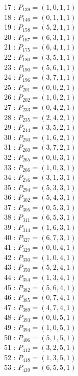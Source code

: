 \documentclass{article}
\begin{document}
{\begin{multicols}{3}
17 : $P_{139}=( 1, 0, 1, 1 )$\\
18 : $P_{146}=( 0, 1, 1, 1 )$\\
19 : $P_{158}=( 5, 2, 1, 1 )$\\
20 : $P_{167}=( 6, 3, 1, 1 )$\\
21 : $P_{175}=( 6, 4, 1, 1 )$\\
22 : $P_{180}=( 3, 5, 1, 1 )$\\
23 : $P_{190}=( 5, 6, 1, 1 )$\\
24 : $P_{196}=( 3, 7, 1, 1 )$\\
25 : $P_{201}=( 0, 0, 2, 1 )$\\
26 : $P_{202}=( 1, 0, 2, 1 )$\\
27 : $P_{233}=( 0, 4, 2, 1 )$\\
28 : $P_{235}=( 2, 4, 2, 1 )$\\
29 : $P_{244}=( 3, 5, 2, 1 )$\\
30 : $P_{250}=( 1, 6, 2, 1 )$\\
31 : $P_{260}=( 3, 7, 2, 1 )$\\
32 : $P_{265}=( 0, 0, 3, 1 )$\\
33 : $P_{266}=( 1, 0, 3, 1 )$\\
34 : $P_{276}=( 3, 1, 3, 1 )$\\
35 : $P_{294}=( 5, 3, 3, 1 )$\\
36 : $P_{302}=( 5, 4, 3, 1 )$\\
37 : $P_{305}=( 0, 5, 3, 1 )$\\
38 : $P_{311}=( 6, 5, 3, 1 )$\\
39 : $P_{314}=( 1, 6, 3, 1 )$\\
40 : $P_{327}=( 6, 7, 3, 1 )$\\
41 : $P_{329}=( 0, 0, 4, 1 )$\\
42 : $P_{330}=( 1, 0, 4, 1 )$\\
43 : $P_{350}=( 5, 2, 4, 1 )$\\
44 : $P_{354}=( 1, 3, 4, 1 )$\\
45 : $P_{382}=( 5, 6, 4, 1 )$\\
46 : $P_{385}=( 0, 7, 4, 1 )$\\
47 : $P_{389}=( 4, 7, 4, 1 )$\\
48 : $P_{393}=( 0, 0, 5, 1 )$\\
49 : $P_{394}=( 1, 0, 5, 1 )$\\
50 : $P_{406}=( 5, 1, 5, 1 )$\\
51 : $P_{412}=( 3, 2, 5, 1 )$\\
52 : $P_{418}=( 1, 3, 5, 1 )$\\
53 : $P_{439}=( 6, 5, 5, 1 )$\\

\end{multicols}}
\end{document}
